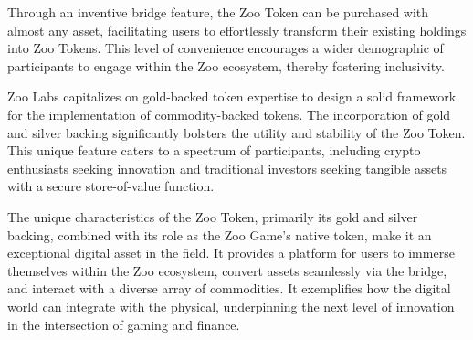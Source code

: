 Through an inventive bridge feature, the Zoo Token can be purchased with almost any asset, facilitating users to effortlessly transform their existing holdings into Zoo Tokens. This level of convenience encourages a wider demographic of participants to engage within the Zoo ecosystem, thereby fostering inclusivity.

Zoo Labs capitalizes on gold-backed token expertise to design a solid framework for the implementation of commodity-backed tokens. The incorporation of gold and silver backing significantly bolsters the utility and stability of the Zoo Token. This unique feature caters to a spectrum of participants, including crypto enthusiasts seeking innovation and traditional investors seeking tangible assets with a secure store-of-value function.

The unique characteristics of the Zoo Token, primarily its gold and silver backing, combined with its role as the Zoo Game's native token, make it an exceptional digital asset in the field. It provides a platform for users to immerse themselves within the Zoo ecosystem, convert assets seamlessly via the bridge, and interact with a diverse array of commodities. It exemplifies how the digital world can integrate with the physical, underpinning the next level of innovation in the intersection of gaming and finance.
